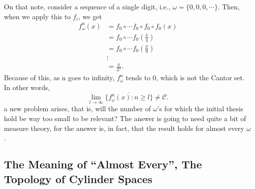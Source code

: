 \documentclass{article}
\begin{document}
On that note, consider a sequence of a single digit, i.e., $\omega =\{0, 0, 0, \cdots\} $. Then, when we apply this to $f_{i}$, we get
  \begin{align*}
    f_{\omega}^{n}(x) &= f_{0}\circ{\cdots}f_{0}\circ{f_{0}}\circ{f_{0}}(x)\\
                      &= f_{0}\circ{\cdots}f_{0}(\frac{x}{3}) \\
                      &= f_{0}\circ{\cdots}f_{0}(\frac{x}{9}) \\
                      &\vdots\\
                      &= \frac{x}{3^{n}}.
  \end{align*}
  Because of this, as n goes to infinity, $f_{\omega}^{n}$ tends to 0, which is not the Cantor set. In other words,
  $$
    \lim_{l\to\infty}\overline{\{f_{\omega}^{n}(x):n\geq{l}\}}\neq \mathcal{C}.
  $$
  a new problem arises, that is, will the number of $\omega$'s for which the initial thesis hold be way too small to be relevant? The answer is going to need
quite a bit of measure theory, for the answer is, in fact, that the result holds for almost every $\omega$.

\subsection{The Meaning of ``Almost Every'', The Topology of Cylinder Spaces}
\end{document}
